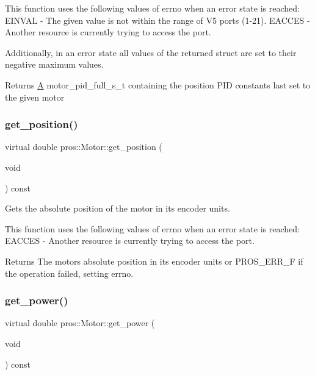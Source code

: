 This function uses the following values of errno when an error state is reached\+: E\+I\+N\+V\+AL -\/ The given value is not within the range of V5 ports (1-\/21). E\+A\+C\+C\+ES -\/ Another resource is currently trying to access the port.

Additionally, in an error state all values of the returned struct are set to their negative maximum values.

\begin{DoxyReturn}{Returns}
\mbox{\hyperlink{structA}{A}} motor\+\_\+pid\+\_\+full\+\_\+s\+\_\+t containing the position P\+ID constants last set to the given motor 
\end{DoxyReturn}
\mbox{\label{classpros_1_1Motor_a70e725a94ec42dc7cbb3e460c36dcad3}} 
\subsubsection{\texorpdfstring{get\_position()}{get\_position()}}
{\footnotesize\ttfamily virtual double pros\+::\+Motor\+::get\+\_\+position (\begin{DoxyParamCaption}\item[{void}]{ }\end{DoxyParamCaption}) const\hspace{0.3cm}{\ttfamily [virtual]}}



Gets the absolute position of the motor in its encoder units. 

This function uses the following values of errno when an error state is reached\+: E\+A\+C\+C\+ES -\/ Another resource is currently trying to access the port.

\begin{DoxyReturn}{Returns}
The motor\textquotesingle{}s absolute position in its encoder units or P\+R\+O\+S\+\_\+\+E\+R\+R\+\_\+F if the operation failed, setting errno. 
\end{DoxyReturn}
\mbox{\label{classpros_1_1Motor_a51b75dc245257487116e64fa2904d521}} 
\subsubsection{\texorpdfstring{get\_power()}{get\_power()}}
{\footnotesize\ttfamily virtual double pros\+::\+Motor\+::get\+\_\+power (\begin{DoxyParamCaption}\item[{void}]{ }\end{DoxyParamCaption}) const\hspace{0.3cm}{\ttfamily [virtual]}}




